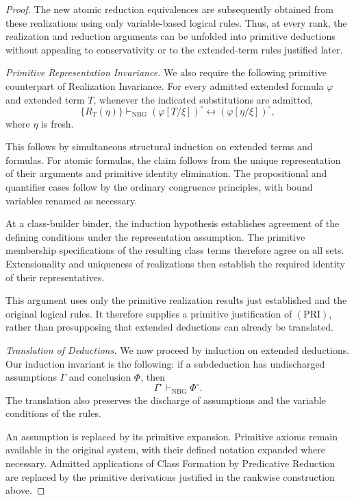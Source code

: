 \begin{proof}
The new atomic reduction equivalences are
subsequently obtained from these realizations
using only variable-based logical rules.
Thus, at every rank, the realization and
reduction arguments can be unfolded into
primitive deductions without appealing to
conservativity or to the extended-term rules
justified later.

\medskip
\noindent\emph{Primitive Representation Invariance.}
We also require the following primitive counterpart
of Realization Invariance. For every admitted
extended formula \(\varphi\) and extended term \(T\),
whenever the indicated substitutions are admitted,
\[
\{R_T(\eta)\}\vdash_{\mathrm{NBG}}
(\varphi[T/\xi])^\circ
\leftrightarrow
(\varphi[\eta/\xi])^\circ,
\tag{PRI}
\]
where \(\eta\) is fresh.

This follows by simultaneous structural induction
on extended terms and formulas. For atomic formulas,
the claim follows from the unique representation
of their arguments and primitive identity
elimination. The propositional and quantifier
cases follow by the ordinary congruence principles,
with bound variables renamed as necessary.

At a class-builder binder, the induction
hypothesis establishes agreement of the defining
conditions under the representation assumption.
The primitive membership specifications of the
resulting class terms therefore agree on all
sets. Extensionality and uniqueness of realizations
then establish the required identity of their
representatives.

This argument uses only the primitive realization
results just established and the original logical
rules. It therefore supplies a primitive
justification of \((\mathrm{PRI})\), rather than
presupposing that extended deductions can already
be translated.

\medskip
\noindent\emph{Translation of Deductions.}
We now proceed by induction on extended deductions.
Our induction invariant is the following: if a
subdeduction has undischarged assumptions \(\Gamma\)
and conclusion \(\Phi\), then
\[
\Gamma^\circ\vdash_{\mathrm{NBG}}\Phi^\circ.
\]
The translation also preserves the discharge of
assumptions and the variable conditions of the
rules.

An assumption is replaced by its primitive
expansion. Primitive axioms remain available in
the original system, with their defined notation
expanded where necessary. Admitted applications
of Class Formation by Predicative Reduction are
replaced by the primitive derivations justified
in the rankwise construction above.


\end{proof}
